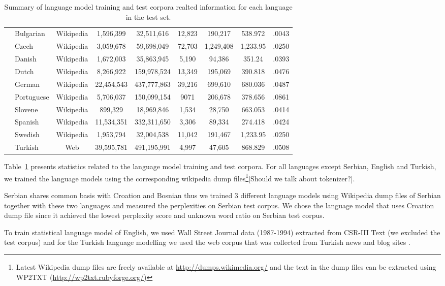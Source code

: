 \begin{table}[h]
\begin{tabular}{l|l|c|c|c|c|c|c|c|}
    &Bulgarian& Wikipedia &1,596,399 & 32,511,616  & 12,823 & 190,217 & 538.972 & .0043\\
    &Czech & Wikipedia &3,059,678 & 59,698,049 & 72,703 & 1,249,408 & 1,233.95 &.0250\\
    &Danish & Wikipedia &1,672,003 & 35,863,945 & 5,190 & 94,386 & 351.24 & .0393\\
    &Dutch & Wikipedia &8,266,922 & 159,978,524 & 13,349 & 195,069 & 390.818 & .0476\\
    &German & Wikipedia &22,454,543&437,777,863 & 39,216 & 699,610 & 680.036 & .0487\\
    &Portuguese & Wikipedia & 5,706,037 & 150,099,154 & 9071 & 206,678 & 378.656 & .0861\\
    &Slovene & Wikipedia & 899,329 & 18,969,846 & 1,534 & 28,750 & 663.053 & .0414\\
    &Spanish & Wikipedia &11,534,351 & 332,311,650& 3,306 & 89,334 & 274.418 & .0424\\
    &Swedish & Wikipedia &1,953,794 & 32,004,538& 11,042 & 191,467 & 1,233.95 & .0250\\
    &Turkish & Web &39,595,781 & 491,195,991& 4,997 & 47,605 & 868.829 & .0508\\
    \hline
  \end{tabular}
  \caption{Summary of language model training and test corpora
  realted information for each language in the test set.}
  \label{tab:lmstatistics}
\end{table}

\noindent Table~\ref{tab:lmstatistics} presents statistics related to the
language model training and test corpora.  For all languages except
Serbian, English and Turkish, we trained the language models using the
corresponding wikipedia dump files\footnote{Latest Wikipedia dump
files are freely available at \url{http://dumps.wikimedia.org/} and
the text in the dump files can be extracted using WP2TXT
(\url{http://wp2txt.rubyforge.org/})}[Should we talk about tokenizer?].

Serbian shares common basis with Croation and Bosnian thus we trained
3 different language models using Wikipedia dump files of Serbian
together with these two languages and measured the perplexities on
Serbian test corpus.  We chose the language model that uses Croation
dump file since it achieved the lowest perplexity score and unknown
word ratio on Serbian test corpus.

To train statistical language model of English, we used Wall Street
Journal data (1987-1994) extracted from CSR-III Text \cite{csr3text}
(we excluded the test corpus) and for the Turkish language modelling
we used the web corpus that was collected from Turkish news and blog
sites \cite{sak2008turkish}.  

